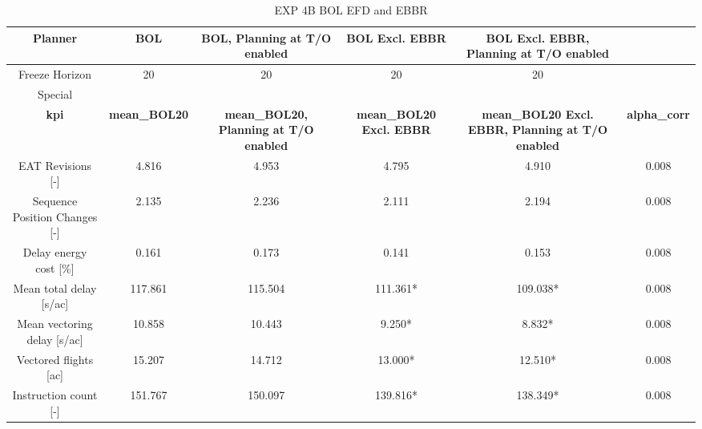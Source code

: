\begin{table}[htbp]
\caption{EXP 4B BOL EFD and EBBR}
\begin{center}
\footnotesize
\setlength{\tabcolsep}{3pt}
\renewcommand{\arraystretch}{1.000}
\begin{tabular}{|c|c|c|c|c|c|}
\hline
Planner & BOL & BOL, Planning at T/O enabled & BOL Excl. EBBR & BOL Excl. EBBR, Planning at T/O enabled &  \\
\hline
Freeze Horizon & 20 & 20 & 20 & 20 &  \\
\hline
Special &  &  &  &  &  \\
\hline
\textbf{kpi} & \textbf{mean\_BOL20} & \textbf{mean\_BOL20, Planning at T/O enabled} & \textbf{mean\_BOL20 Excl. EBBR} & \textbf{mean\_BOL20 Excl. EBBR, Planning at T/O enabled} & \textbf{alpha\_corr} \\
\hline
EAT Revisions [-] & 4.816 & 4.953 & 4.795 & 4.910 & 0.008 \\
\hline
Sequence Position Changes [-] & 2.135 & 2.236 & 2.111 & 2.194 & 0.008 \\
\hline
Delay energy cost [\%] & 0.161 & 0.173 & 0.141 & 0.153 & 0.008 \\
\hline
Mean total delay [s/ac] & 117.861 & 115.504 & 111.361* & 109.038* & 0.008 \\
\hline
Mean vectoring delay [s/ac] & 10.858 & 10.443 & 9.250* & 8.832* & 0.008 \\
\hline
Vectored flights [ac] & 15.207 & 14.712 & 13.000* & 12.510* & 0.008 \\
\hline
Instruction count [-] & 151.767 & 150.097 & 139.816* & 138.349* & 0.008 \\
\hline
\end{tabular}
\label{tab:exp\_4b\_bol\_efd\_and\_ebbr}
\end{center}
\end{table}